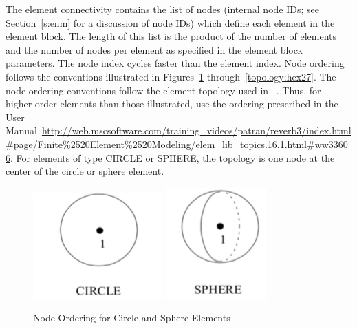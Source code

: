 The element connectivity contains the list of nodes (internal node
IDs; see Section~\ref{s:enm} for a discussion of node IDs) which
define each element in the element block. The length of this list is
the product of the number of elements and the number of nodes per
element as specified in the element block parameters. The node index
cycles faster than the element index. Node ordering follows the
conventions illustrated in Figures~\ref{topology:1d}
through~\ref{topology:hex27}. The node ordering conventions follow the element topology
used in ~\cite{PATRAN}. Thus, for higher-order elements
than those illustrated, use the ordering prescribed in the
 User
Manual~\url{http://web.mscsoftware.com/training_videos/patran/reverb3/index.html#page/Finite%2520Element%2520Modeling/elem_lib_topics.16.1.html#ww33606}. For
elements of type CIRCLE or SPHERE, the topology is one node at the
center of the circle or sphere element.

\begin{figure}
\centering
{}
{\includegraphics{topology/circle.png}}
{\includegraphics{topology/sphere.png}}
\caption{Node Ordering for Circle and Sphere Elements}\label{topology:1d}
\end{figure}


